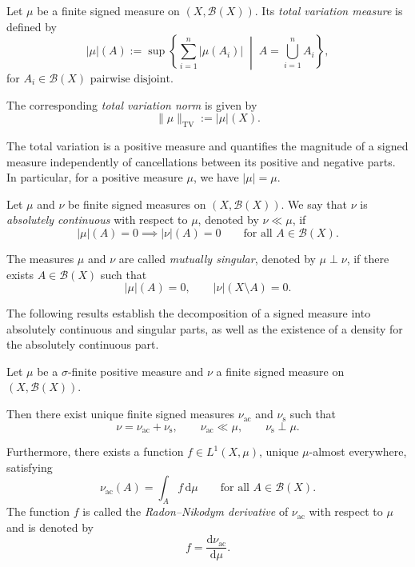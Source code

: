 \begin{definition}
    Let $\mu$ be a finite signed measure on
    $(X,\mathcal{B}(X))$. Its
    \emph{total variation measure} is defined by
    \[
        |\mu|(A)
        :=\sup\left\{
            \sum_{i=1}^{n}|\mu(A_i)|
            \;\middle|\;
                A=\bigcup_{i=1}^{n}A_i
        \right\},
    \]
	for $A_i\in\mathcal{B}(X)\text{ pairwise disjoint}$.

    The corresponding \emph{total variation norm}
    is given by
    \[
        \|\mu\|_{\mathrm{TV}}:=|\mu|(X).
    \]
\end{definition}
The total variation is a positive measure
and quantifies the magnitude of a signed
measure independently of cancellations
between its positive and negative parts.
In particular, for a positive measure $\mu$,
we have $|\mu|=\mu$.

\begin{definition}
    Let $\mu$ and $\nu$ be finite signed
    measures on $(X,\mathcal{B}(X))$. We say that $\nu$ is
    \emph{absolutely continuous} with respect
    to $\mu$, denoted by $\nu\ll\mu$, if
    \[
        |\mu|(A)=0
        \implies |\nu|(A)=0
        \qquad
        \text{for all }A\in\mathcal{B}(X).
    \]

    The measures $\mu$ and $\nu$ are called
    \emph{mutually singular}, denoted by
    $\mu\perp\nu$, if there exists
    $A\in\mathcal{B}(X)$ such that
    \[
        |\mu|(A)=0,
        \qquad
        |\nu|(X\setminus A)=0.
    \]
\end{definition}

The following results establish the
decomposition of a signed measure into
absolutely continuous and singular parts,
as well as the existence of a density for
the absolutely continuous part.

\begin{theorem}
    Let $\mu$ be a $\sigma$-finite positive
    measure and $\nu$ a finite signed
    measure on $(X,\mathcal{B}(X))$.

    Then there exist unique finite signed
    measures $\nu_{\mathrm{ac}}$ and
    $\nu_{\mathrm{s}}$ such that
    \[
        \nu=\nu_{\mathrm{ac}}+\nu_{\mathrm{s}},
        \qquad
        \nu_{\mathrm{ac}}\ll\mu,
        \qquad
        \nu_{\mathrm{s}}\perp\mu.
    \]

    Furthermore, there exists a function
    $f\in L^1(X,\mu)$, unique
    $\mu$-almost everywhere, satisfying
    \[
        \nu_{\mathrm{ac}}(A)
        =\int_A f\,\mathrm{d}\mu
        \qquad
        \text{for all }A\in\mathcal{B}(X).
    \]
    The function $f$ is called the
    \emph{Radon--Nikodym derivative} of
    $\nu_{\mathrm{ac}}$ with respect to $\mu$
    and is denoted by
    \[
        f=\frac{\mathrm{d}\nu_{\mathrm{ac}}}
                {\mathrm{d}\mu}.
    \]
\end{theorem}

